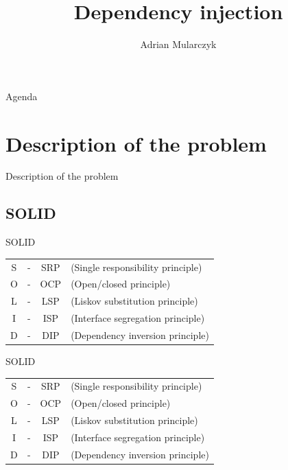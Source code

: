 \documentclass{beamer}
\title[]
{Dependency injection}
\author[Adrian Mularczyk]{Adrian Mularczyk}
\institute[PGS Softwarei]
{
PGS Software
}
\date{}
\begin{document}
\begin{frame}
  \titlepage 
\end{frame}

\begin{frame}{Agenda}
  \tableofcontents
\end{frame}

\section{Description of the problem}

\begin{frame}{}
\begin{center}
\Huge{Description of the problem}
\end{center}
\end{frame}

\subsection*{SOLID}

\begin{frame}{SOLID}
\begin{table}
     \begin{Large}
	\begin{tabular}{ c c c l }
	S &-& SRP& (Single responsibility principle)\\
	O &-& OCP& (Open/closed principle)\\
	L &-& LSP& (Liskov substitution principle)\\
	I &-& ISP& (Interface segregation principle)\\
	D &-& DIP& (Dependency inversion principle)
	\end{tabular}
     \end{Large}
\end{table}
\end{frame}

\begin{frame}{SOLID}
\begin{table}
     \begin{Large}
	\begin{tabular}{ c c c l }
\color{gray} S &\color{gray}-& \color{gray}SRP& \color{gray}(Single responsibility principle)\\
\color{gray} O &\color{gray}-& \color{gray}OCP& \color{gray}(Open/closed principle)\\
\color{gray}	L &\color{gray}-& \color{gray}LSP& \color{gray}(Liskov substitution principle)\\
\color{gray}	I &\color{gray}-& \color{gray}ISP& \color{gray}(Interface segregation principle)\\
	D &-& DIP& (Dependency inversion principle)
	\end{tabular}
     \end{Large}
\end{table}
\end{frame}
\end{document}
